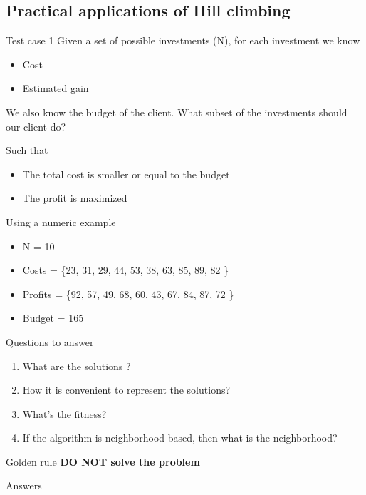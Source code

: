 \subsection{Practical applications of Hill climbing}

Test case 1 \ra Given a set of possible investments (N), for each investment we know

\begin{itemize}
    \item Cost
    \item Estimated gain
\end{itemize}

We also know the budget of the client. What subset of the investments should our client do? 

Such that
\begin{itemize}
    \item The total cost is smaller or equal to the budget
    \item The profit is maximized
\end{itemize}


Using a numeric example

\begin{itemize}
    \item N = 10
    \item Costs = \{23, 31, 29, 44, 53, 38, 63, 85, 89, 82 \}
    \item Profits = \{92, 57, 49, 68, 60, 43, 67, 84, 87, 72 \}
    \item Budget = 165
\end{itemize}

\vspace{10pt}
Questions to answer
\begin{enumerate}
    \item What are the solutions ?
    \item How it is convenient to represent the solutions?
    \item What's the fitness?
    \item If the algorithm is neighborhood based, then what is the neighborhood?
\end{enumerate}

Golden rule \ra \textbf{DO NOT solve the problem}

Answers

